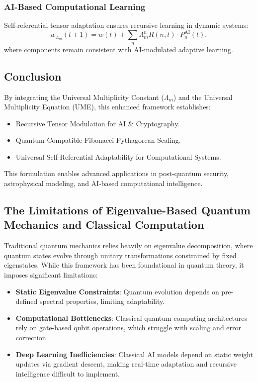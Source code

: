 \documentclass{article}
\theoremstyle{plain}
\begin{document}
\begin{itemize}
\begin{itemize}
\subsubsection{AI-Based Computational Learning}
Self-referential tensor adaptation ensures recursive learning in dynamic systems:
\begin{equation}
w_{\Lambda_m}(t+1) = w(t) + \sum_{n} \Lambda_m^n R(n, t) \cdot P_n^{\text{AI}}(t),
\end{equation}
where components remain consistent with AI-modulated adaptive learning.

\subsection{Conclusion}
By integrating the Universal Multiplicity Constant ($\Lambda_m$) and the Universal Multiplicity Equation (UME), this enhanced framework establishes:
\begin{itemize}
    \item Recursive Tensor Modulation for AI \& Cryptography.
    \item Quantum-Compatible Fibonacci-Pythagorean Scaling.
    \item Universal Self-Referential Adaptability for Computational Systems.
\end{itemize}
This formulation enables advanced applications in post-quantum security, astrophysical modeling, and AI-based computational intelligence.
\subsection{The Limitations of Eigenvalue-Based Quantum Mechanics and Classical Computation}

Traditional quantum mechanics relies heavily on eigenvalue decomposition, where quantum states evolve through unitary transformations constrained by fixed eigenstates. While this framework has been foundational in quantum theory, it imposes significant limitations:
\begin{itemize}
    \item \textbf{Static Eigenvalue Constraints}: Quantum evolution depends on pre-defined spectral properties, limiting adaptability.
    \item \textbf{Computational Bottlenecks}: Classical quantum computing architectures rely on gate-based qubit operations, which struggle with scaling and error correction.
    \item \textbf{Deep Learning Inefficiencies}: Classical AI models depend on static weight updates via gradient descent, making real-time adaptation and recursive intelligence difficult to implement.
\end{itemize}


\end{itemize}
\end{itemize}
\end{document}

